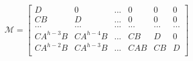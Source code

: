 \begin{equation}
        \mathcal{M} = \begin{bmatrix}
                  D           
                    & 0           
                            & ... 
                                        & 0   
                                            & 0   
                                                & 0   \\
                  CB          & D           
                            & ... 
                                        & 0   
                                            & 0   
                                                & 0   \\
                  ...         
                    & ...         
                            & ... 
                                        & ... 
                                            & ... 
                                                & ... \\
                  C A^{h-3} B 
                    & C A^{h-4} B 
                            & ... 
                                        & CB  
                                            & D   
                                                & 0   \\
                  C A^{h-2} B 
                    & C A^{h-3} B 
                            & ... 
                                        & CAB 
                                            & CB  
                                                & D   \\
                 \end{bmatrix}
\end{equation}
    
